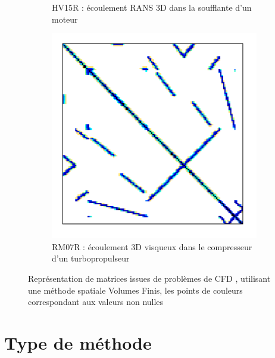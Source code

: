 \begin{figure}
\begin{subfigure}[t]{0.3\textwidth}
			\caption{HV15R : écoulement RANS 3D dans la soufflante d'un moteur}
			\label{fig:sparse.HV15R}
		\end{subfigure}
		\hfill
		\begin{subfigure}[t]{0.3\textwidth}
			\centering
			\includegraphics[width=\textwidth]{images/RM07R.png}
			\caption{RM07R : écoulement 3D visqueux dans le compresseur d'un turbopropulseur}
			\label{fig:sparse.RM07R}
		\end{subfigure}
		\caption{Représentation de matrices issues de problèmes de CFD \cite{PacullAubertBuisson2011}, utilisant une méthode spatiale Volumes Finis, les points de couleurs correspondant aux valeurs non nulles}
		\label{fig:sparse}
	\end{figure}


\section{Type de méthode}

